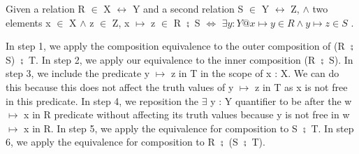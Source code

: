 \documentclass[a4paper,10pt,fleqn]{article}
\begin{document}
\bigskip

\noindent Given a relation R $\in$ X $\rel$ Y and a second relation S $\in$ Y $\rel$ Z, $\land$ two elements x $\in$ X $\land$ z $\in$ Z, x $\mapsto$ z $\in$ R $\semi$ S $\Leftrightarrow$ $\exists y : Y @ x \mapsto y \in R \land y \mapsto z \in S$ \citep[page 107]{simpson-notes}.

\bigskip

\begin{center}
\end{center}
\bigskip

\noindent In step 1, we apply the composition equivalence to the outer composition of (R $\semi$ S) $\semi$ T. In step 2, we apply our equivalence to the inner composition (R $\semi$ S).  In step 3, we include the predicate y $\mapsto$ z in T in the scope of x : X. We can do this because this does not affect the truth values of y $\mapsto$ z in T as x is not free in this predicate. In step 4, we reposition the $\exists$ y : Y quantifier to be after the w $\mapsto$ x in R predicate without affecting its truth values because y is not free in w $\mapsto$ x in R.  In step 5, we apply the equivalence for composition to S $\semi$ T.  In step 6, we apply the equivalence for composition to R $\semi$ (S $\semi$ T).
\end{document}
